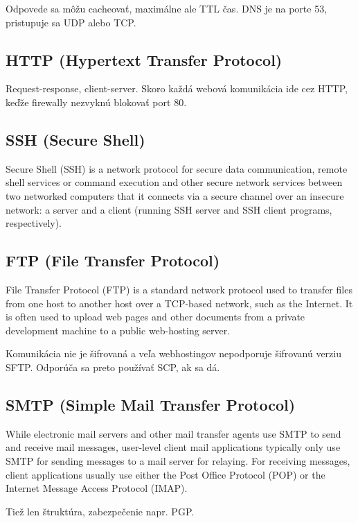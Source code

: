 \documentclass[10pt,a4paper]{article}
\begin{document}
Odpovede sa môžu cacheovať, maximálne ale TTL čas. DNS je na porte 53, pristupuje sa UDP alebo TCP. 

\subsection{HTTP (Hypertext Transfer Protocol)}  
Request-response, client-server. Skoro každá webová komunikácia ide cez HTTP, keďže firewally nezvyknú blokovať port 80. 
 
\subsection{SSH (Secure Shell)}   
Secure Shell (SSH) is a network protocol for secure data communication, remote shell services or command execution and other secure network services between two networked computers that it connects via a secure channel over an insecure network: a server and a client (running SSH server and SSH client programs, respectively).

\subsection{FTP (File Transfer Protocol)}  
File Transfer Protocol (FTP) is a standard network protocol used to transfer files from one host to another host over a TCP-based network, such as the Internet. It is often used to upload web pages and other documents from a private development machine to a public web-hosting server.

Komunikácia nie je šifrovaná a veľa webhostingov nepodporuje šifrovanú verziu SFTP. Odporúča sa preto používať SCP, ak sa dá.  
 
\subsection{SMTP (Simple Mail Transfer Protocol)}   
While electronic mail servers and other mail transfer agents use SMTP to send and receive mail messages, user-level client mail applications typically only use SMTP for sending messages to a mail server for relaying. For receiving messages, client applications usually use either the Post Office Protocol (POP) or the Internet Message Access Protocol (IMAP). 

Tiež len štruktúra, zabezpečenie napr. PGP. 
\end{document}
